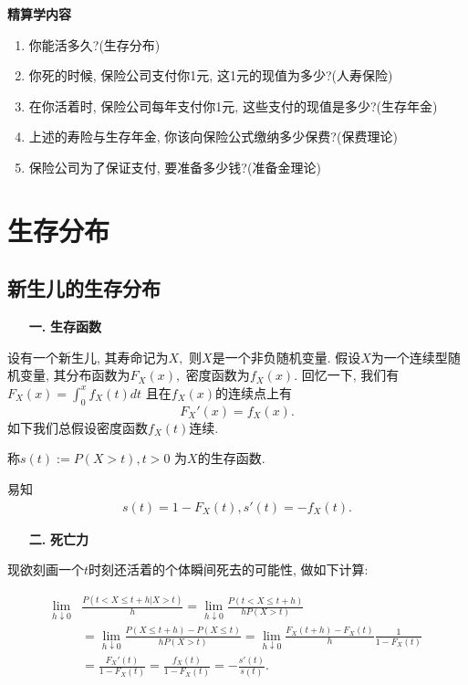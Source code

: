 \documentclass[a4paper,10pt]{ctexbook}
\newcommand{\hei}{\CJKfamily{hei}}      %
\def\no{\nonumber}
\begin{document}
\begin{center}
    {\bf\hei 精算学内容}
\end{center}
\begin{enumerate}
    \item 你能活多久?(生存分布)
    \item 你死的时候, 保险公司支付你1元, 这1元的现值为多少?(人寿保险)
    \item 在你活着时, 保险公司每年支付你1元, 这些支付的现值是多少?(生存年金)
    \item 上述的寿险与生存年金, 你该向保险公式缴纳多少保费?(保费理论)
    \item 保险公司为了保证支付, 要准备多少钱?(准备金理论)
\end{enumerate}
\newpage
\thispagestyle{empty}

\mainmatter
\chapter{生存分布}
\section{新生儿的生存分布}
\begin{itemize}
    \item[{\bf\hei 一.}]{\bf\hei 生存函数}
\end{itemize}

设有一个新生儿, 其寿命记为$X,$ 则$X$是一个非负随机变量. 假设$X$为一个连续型随机变量, 其分布函数为$F_X(x),$ 密度函数为$f_X(x).$ 回忆一下, 我们有 $F_X(x)=\int_0^x f_X(t)dt$ 且在$f_X(x)$的连续点上有
$$F_X'(x)=f_X(x).$$
如下我们总假设密度函数$f_X(t)$连续.
\begin{definition}
    称$s(t):=P(X>t),t>0$ 为$X$的生存函数.
\end{definition}
易知
\begin{align}\label{sf}
    s(t)=1-F_X(t), s'(t)=-f_X(t).
\end{align}

\begin{itemize}
    \item[{\bf\hei  二.}]{\bf\hei 死亡力}
\end{itemize}

现欲刻画一个$t$时刻还活着的个体瞬间死去的可能性, 做如下计算:

\begin{align}\label{swl}
    \lim_{h\downarrow0} & \frac{P(t<X\le t+h|X>t)}{h}=\lim_{h\downarrow0} \frac{P(t<X\le t+h)}{hP(X>t)}\no                                            \\
                        & =\lim_{h\downarrow0}\frac{P(X\le t+h)-P(X\le t)}{hP(X>t)}=\lim_{h\downarrow0}\frac{F_X(t+h)-F_X(t)}{h}\frac{1}{1-F_X(t)}\no \\
                        & =\frac{F_X'(t)}{1-F_X(t)}=\frac{f_X(t)}{1-F_X(t)}=-\frac{s'(t)}{s(t)}.
\end{align}
\end{document}
